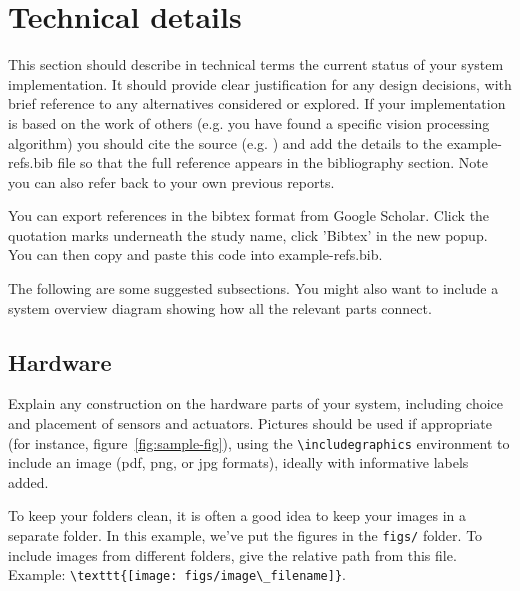 \documentclass{article}
\begin{document}
\section{Technical details}

This section should describe in technical terms the current status of your system implementation. It should provide clear justification for any design decisions, with brief reference to any alternatives considered or explored. If your implementation is based on the work of others (e.g. you have found a specific vision processing algorithm) you should cite the source (e.g. \cite{Newell81}) and add the details to the example-refs.bib file so that the full reference appears in the bibliography section. Note you can also refer back to your own previous reports. 

You can export references in the bibtex format from Google Scholar. Click the quotation marks underneath the study name, click 'Bibtex' in the new popup. You can then copy and paste this code into example-refs.bib.

The following are some suggested subsections. You might also want to include a system overview diagram showing how all the relevant parts connect. 

\subsection{Hardware}

Explain any construction on the hardware parts of your system, including choice and placement of sensors and actuators. Pictures should be used if appropriate (for instance, figure~\ref{fig:sample-fig}), using the \verb+\includegraphics+ environment to include an image (pdf, png, or jpg formats), ideally with informative labels added. 

To keep your folders clean, it is often a good idea to keep your images in a separate folder. In this example, we've put the figures in the \texttt{figs/} folder. To include images from different folders, give the relative path from this file. Example: \verb+\texttt{[image: figs/image\_filename]}+.

\end{document}
